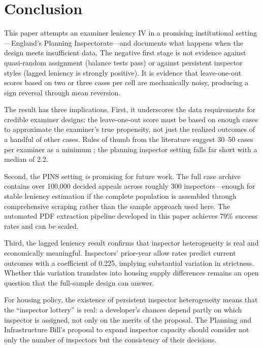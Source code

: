 \documentclass[12pt]{article}
\begin{document}


\section{Conclusion}
\label{sec:conclusion}

This paper attempts an examiner leniency IV in a promising institutional setting---England's Planning Inspectorate---and documents what happens when the design meets insufficient data. The negative first stage is not evidence against quasi-random assignment (balance tests pass) or against persistent inspector styles (lagged leniency is strongly positive). It is evidence that leave-one-out scores based on two or three cases per cell are mechanically noisy, producing a sign reversal through mean reversion.

The result has three implications. First, it underscores the data requirements for credible examiner designs: the leave-one-out score must be based on enough cases to approximate the examiner's true propensity, not just the realized outcomes of a handful of other cases. Rules of thumb from the literature suggest 30--50 cases per examiner as a minimum \citep{frandsen2023judging}; the planning inspector setting falls far short with a median of 2.2.

Second, the PINS setting \textit{is} promising for future work. The full case archive contains over 100,000 decided appeals across roughly 300 inspectors---enough for stable leniency estimation if the complete population is assembled through comprehensive scraping rather than the sample approach used here. The automated PDF extraction pipeline developed in this paper achieves 79\% success rates and can be scaled.

Third, the lagged leniency result confirms that inspector heterogeneity is real and economically meaningful. Inspectors' prior-year allow rates predict current outcomes with a coefficient of 0.225, implying substantial variation in strictness. Whether this variation translates into housing supply differences remains an open question that the full-sample design can answer.

For housing policy, the existence of persistent inspector heterogeneity means that the ``inspector lottery'' is real: a developer's chances depend partly on which inspector is assigned, not only on the merits of the proposal. The Planning and Infrastructure Bill's proposal to expand inspector capacity should consider not only the number of inspectors but the consistency of their decisions.
\end{document}
